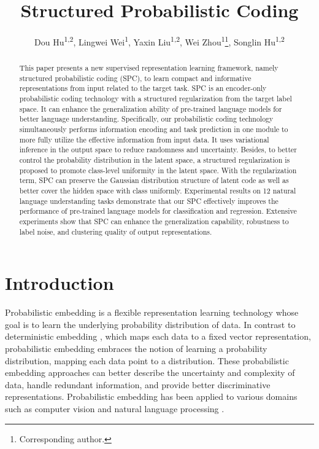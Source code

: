 \documentclass[letterpaper]{article} %
\title{Structured Probabilistic Coding}
\author{Dou Hu\textsuperscript{\rm 1,\rm 2}, Lingwei Wei\textsuperscript{\rm 1}, Yaxin Liu\textsuperscript{\rm 1,\rm 2}, Wei Zhou\textsuperscript{\rm 1}\thanks{Corresponding author.}, Songlin Hu\textsuperscript{{\rm 1},{\rm 2}}\footnotemark[1]
}
\begin{document}
\maketitle
\begin{abstract}
This paper presents a new supervised representation learning framework, namely structured probabilistic coding (SPC), to learn compact and informative representations from input related to the target task. SPC is an encoder-only probabilistic coding technology with a structured regularization from the target label space. It can enhance the generalization ability of pre-trained language models for better language understanding. Specifically, our probabilistic coding technology simultaneously performs information encoding and task prediction in one module to more fully utilize the effective information from input data. It uses variational inference in the output space to reduce randomness and uncertainty. Besides, to better control the probability distribution in the latent space, a structured regularization is proposed to promote class-level uniformity in the latent space. With the regularization term, SPC can preserve the Gaussian distribution structure of latent code as well as better cover the hidden space with class uniformly. Experimental results on 12 natural language understanding tasks demonstrate that our SPC effectively improves the performance of pre-trained language models for classification and regression. Extensive experiments show that SPC can enhance the generalization capability, robustness to label noise, and clustering quality of output representations.

\end{abstract}

\section{Introduction}

Probabilistic embedding \cite{DBLP:journals/corr/VilnisM14} is a flexible representation learning technology whose goal is to learn the underlying probability distribution of data. In contrast to deterministic embedding \cite{DBLP:conf/iclr/PereyraTCKH17,DBLP:conf/iclr/MiyatoDG17,gunel2020supervised}, which maps each data to a fixed vector representation, probabilistic embedding embraces the notion of learning a probability distribution, mapping each data point to a distribution.
These probabilistic embedding approaches can better describe the uncertainty and complexity of data, handle redundant information, and provide better discriminative representations.
Probabilistic embedding has been applied to various domains such as computer vision \cite{DBLP:conf/iclr/OhMPRSG19,DBLP:conf/iccv/ShiJ19} and natural language processing \cite{DBLP:conf/iclr/MahabadiBH21,DBLP:conf/emnlp/0001HDZJMS22}.
\end{document}
